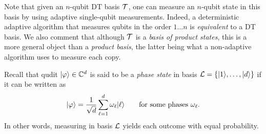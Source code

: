 \begin{remark}
    Note that given an $n$-qubit DT basis $\mathcal{T}$, one can measure an $n$-qubit state in this basis by using adaptive single-qubit measurements.
    Indeed, a deterministic adaptive algorithm that measures qubits in the order $1 \dots n$ is \emph{equivalent} to a DT basis.
    We also comment that although $\mathcal{T}$ is a \emph{basis of product states}, this is a more general object than a \emph{product basis}, the latter being what a non-adaptive algorithm uses to measure each copy.
\end{remark}

\begin{definition}
    Recall that qudit $\lvert\varphi\rangle \in \mathbb{C}^d$ is said to be a \emph{phase state} in basis $\mathcal{L} = \{ \lvert1\rangle, \dots, \lvert d\rangle \}$ if it can be written as
    \begin{equation*}
        \lvert\varphi\rangle = \frac{1}{\sqrt{d}} \sum_{\ell=1}^d \omega_\ell \lvert\ell\rangle \qquad \text{for some phases $\omega_\ell$}.
    \end{equation*}
    In other words, measuring in basis $\cal{L}$ yields each outcome with equal probability.
\end{definition}

